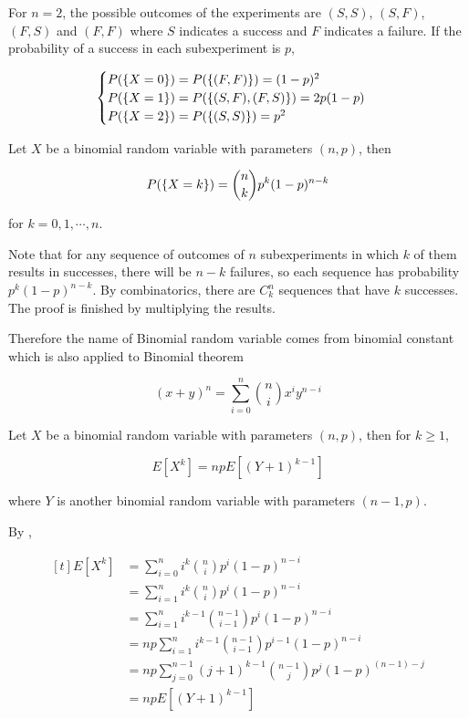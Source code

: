 \documentclass[a4paper,12pt]{article}
\begin{document}
\begin{exm}
  For $n=2$, the possible outcomes of the experiments are $(S,S)$, $(S,F)$, $(F,S)$ and $(F,F)$ where $S$ indicates a success and $F$ indicates a failure. If the probability of a success in each subexperiment is $p$,

  $$\begin{cases}
    P(\left\{ X=0\right\})=P(\left\{ (F,F)\right\})=(1-p)^{2}\\
    P(\left\{ X=1\right\})=P(\left\{ (S,F),(F,S)\right\})=2p(1-p)\\
    P(\left\{ X=2\right\})=P(\left\{ (S,S)\right\})=p^{2}
  \end{cases}$$
\end{exm}\n

\begin{pst}
  Let $X$ be a binomial random variable with parameters $(n,p)$, then

  $$P(\left\{ X=k\right\})=\binom{n}{k}p^{k}(1-p)^{n-k}$$\s

  for $k=0,1,\cdots,n$.\n

  \prf Note that for any sequence of outcomes of $n$ subexperiments in which $k$ of them results in successes, there will be $n-k$ failures, so each sequence has probability $p^{k}(1-p)^{n-k}$. By combinatorics, there are $C_{k}^{n}$ sequences that have $k$ successes. The proof is finished by multiplying the results.
\end{pst}\n

Therefore the name of Binomial random variable comes from binomial constant which is also applied to Binomial theorem

$$(x+y)^{n}=\sum_{i=0}^{n}\binom{n}{i}x^{i}y^{n-i}$$\s

\begin{pst}
  Let $X$ be a binomial random variable with parameters $(n,p)$, then for $k\geq 1$,

  $$E[X^{k}]=npE[(Y+1)^{k-1}]$$\s

  where $Y$ is another binomial random variable with parameters $(n-1,p)$.\n

  \prf By \rdft[\sctd{3}],

  $$\begin{aligned}[t]
    E[X^{k}]&=\sum_{i=0}^{n}i^{k}\binom{n}{i}p^{i}(1-p)^{n-i}\\
    &=\sum_{i=1}^{n}i^{k}\binom{n}{i}p^{i}(1-p)^{n-i}\\
    &=\sum_{i=1}^{n}i^{k-1}\binom{n-1}{i-1}p^{i}(1-p)^{n-i}\\
    &=np\sum_{i=1}^{n}i^{k-1}\binom{n-1}{i-1}p^{i-1}(1-p)^{n-i}\\
    &=np\sum_{j=0}^{n-1}(j+1)^{k-1}\binom{n-1}{j}p^{j}(1-p)^{(n-1)-j}\\
    &=npE[(Y+1)^{k-1}]
  \end{aligned}$$
\end{pst}\n
\end{document}

